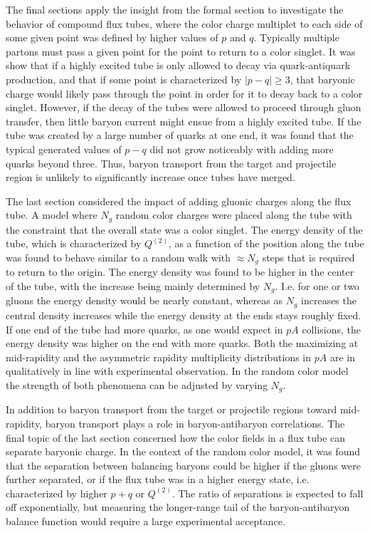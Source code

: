 \documentclass[aps, prc, 12pt, nofootinbib, showpacs, superscriptaddress, tightenlines, groupedaddress]{revtex4-2}
\begin{document}
The final sections apply the insight from the formal section to investigate the behavior of compound flux tubes, where the color charge multiplet to each side of some given point was defined by higher values of $p$ and $q$. Typically multiple partons must pass a given point for the point to return to a color singlet. It was show that if a highly excited tube is only allowed to decay via quark-antiquark production, and that if some point is characterized by $|p-q|\ge 3$, that baryonic charge would likely pass through the point in order for it to decay back to a color singlet. However, if the decay of the tubes were allowed to proceed through gluon transfer, then little baryon current might ensue from a highly excited tube. If the tube was created by a large number of quarks at one end, it was found that the typical generated values of $p-q$ did not grow noticeably with adding more quarks beyond three. Thus, baryon transport from the target and projectile region is unlikely to significantly increase once tubes have merged.

The last section considered the impact of adding gluonic charges along the flux tube. A model where $N_g$ random color charges were placed along the tube with the constraint that the overall state was a color singlet.  The energy density of the tube, which is characterized by $Q^{(2)}$, as a function of the position along the tube was found to behave similar to a random walk with $\approx N_g$ steps that is required to return to the origin. The energy density was found to be higher in the center of the tube, with the increase being mainly determined by $N_g$. I.e. for one or two gluons the energy density would be nearly constant, whereas as $N_g$ increases the central density increases while the energy density at the ends stays roughly fixed. If one end of the tube had more quarks, as one would expect in $pA$ collisions, the energy density was higher on the end with more quarks. Both the maximizing at mid-rapidity and the asymmetric rapidity multiplicity distributions in $pA$ are in qualitatively in line with experimental observation. In the random color model the strength of both phenomena can be adjusted by varying $N_g$.

In addition to baryon transport from the target or projectile regions toward mid-rapidity, baryon transport plays a role in baryon-antibaryon correlations. The final topic of the last section concerned how the color fields in a flux tube can separate baryonic charge. In the context of the random color model, it was found that the separation between balancing baryons could be higher if the gluons were further separated, or if the flux tube was in a higher energy state, i.e. characterized by higher $p+q$ or $Q^{(2)}$. The ratio of separations is expected to fall off exponentially, but measuring the longer-range tail of the baryon-antibaryon balance function would require a large experimental acceptance.
\end{document}
